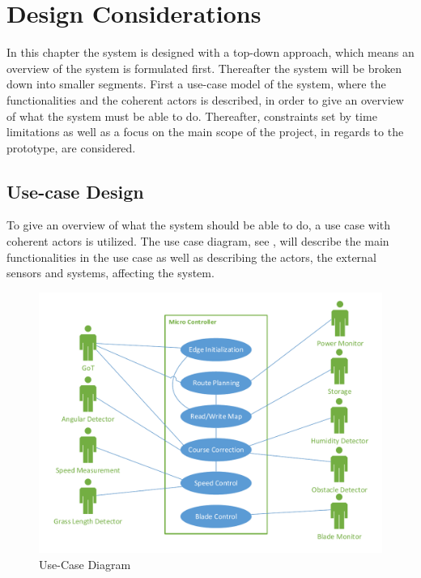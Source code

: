 \chapter{Design Considerations}
\vspace{-5 mm}
In this chapter the system is designed with a top-down approach, which means an overview of the system is formulated first. Thereafter the system will be broken down into smaller segments. First a use-case model of the system, where the functionalities and the coherent actors is described, in order to give an overview of what the system must be able to do. Thereafter, constraints set by time limitations as well as a focus on the main scope of the project, in regards to the prototype, are considered.
\vspace{-4 mm}
\section{Use-case Design} \label{sec:UseCase}
To give an overview of what the system should be able to do, a use case with coherent actors is utilized. The use case diagram, see , will describe the main functionalities in the use case as well as describing the actors, the external sensors and systems, affecting the system.

%
 \begin{figure}[H]
	\centering
	\includegraphics[scale=0.8]{figures/P5UseCase.pdf}
	\caption{Use-Case Diagram}
	\label{fig:usecase}
\end{figure}

